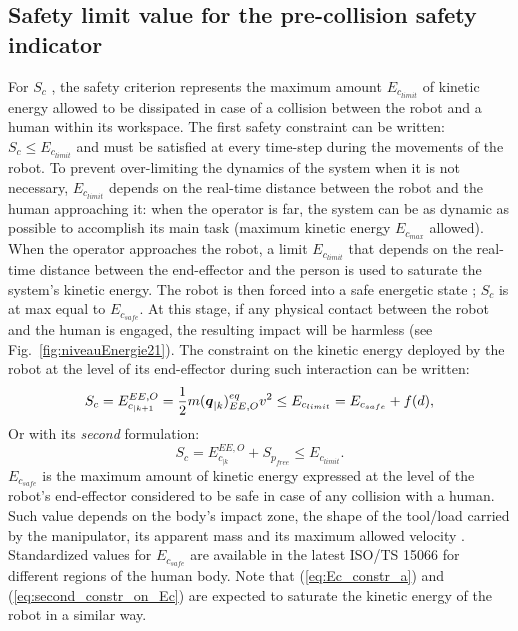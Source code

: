 \documentclass[letterpaper, 10 pt, conference]{ieeeconf}      %
\newcommand{\vect}[1]{\mbox{\boldmath${#1}$}}%
\begin{document}
\subsection{Safety limit value for the pre-collision safety indicator}
For $S_c$ , the safety criterion represents
the maximum amount $E_{c_{limit}}$ of kinetic energy allowed to be dissipated in case of a collision between the robot and a human within its workspace. The first safety constraint can be written: $S_c \leq E_{c_{limit}}$ and must be satisfied at every time-step during the movements of the robot. To prevent over-limiting the dynamics of the system when it is not necessary, $E_{c_{limit}}$ depends on the real-time distance between the robot and the human approaching it: when the operator is far, the system can be as dynamic as possible to accomplish its main task (maximum kinetic energy $E_{c_{max}}$ allowed). When the operator approaches the robot, a limit $E_{c_{limit}}$ that depends on the real-time distance between the end-effector and the person is used to saturate the system's kinetic energy. The robot is then forced into a safe energetic state \cite{ISO15066PDF}; $S_c$ is at max equal to $E_{c_{safe}}$. At this stage, if any physical contact between the robot and the human is engaged, the resulting impact will be harmless (see Fig.~\ref{fig:niveauEnergie21}). The constraint on the kinetic energy deployed by the robot at the level of its end-effector during such interaction can be written:
\begin{equation}
S_c = E_{c_{|k+1}}^{EE,O} = \frac{1}{2} m(\vect{q}_{|k})_{EE,O}^{eq} v^{2} \leq E_{c_{limit}} = E_{c_{safe}} + f(d),
\label{eq:Ec_constr_a}
\end{equation} 
Or with its \textit{second} formulation:
\begin{equation}
S_c = E_{c_{|k}}^{EE,O} + S_{p_{free}} \leq E_{c_{limit}}.
\label{eq:second_constr_on_Ec}
\end{equation}
$E_{c_{safe}}$ is the maximum amount of kinetic energy expressed at the level of the robot's end-effector considered to be safe in case of any collision with a human. Such value depends on the body's impact zone, the shape of the tool/load carried by the manipulator, its apparent mass and its maximum allowed velocity \cite{haddadin2012truly}. Standardized values for $E_{c_{safe}}$ are available in the latest ISO/TS 15066 \cite{ISO15066PDF} for different regions of the human body. Note that (\ref{eq:Ec_constr_a}) and (\ref{eq:second_constr_on_Ec}) are expected to saturate the kinetic energy of the robot in a similar way.
\end{document}

